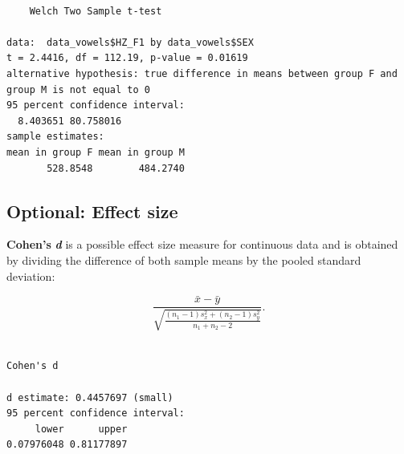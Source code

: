 \documentclass[
  11pt,
  letterpaper,
  DIV=11,
  numbers=noendperiod]{scrreprt}
\newenvironment{Shaded}{\begin{snugshade}}{\end{snugshade}}
\newcommand{\CommentTok}[1]{\textcolor[rgb]{0.37,0.37,0.37}{#1}}
\newcommand{\DecValTok}[1]{\textcolor[rgb]{0.68,0.00,0.00}{#1}}
\newcommand{\DocumentationTok}[1]{\textcolor[rgb]{0.37,0.37,0.37}{\textit{#1}}}
\newcommand{\FunctionTok}[1]{\textcolor[rgb]{0.28,0.35,0.67}{#1}}
\newcommand{\NormalTok}[1]{\textcolor[rgb]{0.00,0.23,0.31}{#1}}
\newcommand{\OtherTok}[1]{\textcolor[rgb]{0.00,0.23,0.31}{#1}}
\newcommand{\SpecialCharTok}[1]{\textcolor[rgb]{0.37,0.37,0.37}{#1}}
\newcommand{\StringTok}[1]{\textcolor[rgb]{0.13,0.47,0.30}{#1}}
\begin{document}
\begin{verbatim}

    Welch Two Sample t-test

data:  data_vowels$HZ_F1 by data_vowels$SEX
t = 2.4416, df = 112.19, p-value = 0.01619
alternative hypothesis: true difference in means between group F and group M is not equal to 0
95 percent confidence interval:
  8.403651 80.758016
sample estimates:
mean in group F mean in group M 
       528.8548        484.2740 
\end{verbatim}

\subsection{Optional: Effect size}\label{optional-effect-size}

\textbf{Cohen's} \textbf{\emph{d}} is a possible effect size measure for
continuous data and is obtained by dividing the difference of both
sample means by the pooled standard deviation:

\[\frac{\bar{x} - \bar{y}}{\sqrt{\frac{{(n_1 - 1)s_x^2 + (n_2 - 1)s_y^2}}{{n_1 + n_2 - 2}}}}.\]

\begin{Shaded}
\end{Shaded}

\begin{verbatim}

Cohen's d

d estimate: 0.4457697 (small)
95 percent confidence interval:
     lower      upper 
0.07976048 0.81177897 
\end{verbatim}
\end{document}
